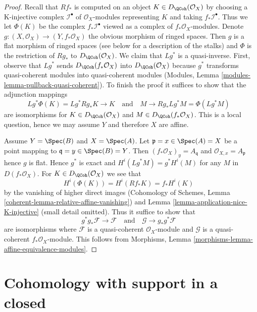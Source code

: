 \begin{proof}
Recall that $Rf_*$ is computed on an object $K \in D_\QCoh(\mathcal{O}_X)$
by choosing a K-injective complex $\mathcal{I}^\bullet$ of
$\mathcal{O}_X$-modules representing $K$ and taking $f_*\mathcal{I}^\bullet$.
Thus we let $\Phi(K)$ be the complex $f_*\mathcal{I}^\bullet$
viewed as a complex of $f_*\mathcal{O}_X$-modules.
Denote $g : (X, \mathcal{O}_X) \to (Y, f_*\mathcal{O}_X)$ the
obvious morphism of ringed spaces. Then $g$ is a flat morphism of
ringed spaces (see below for a description of the stalks) and
$\Phi$ is the restriction of $Rg_*$ to $D_\QCoh(\mathcal{O}_X)$.
We claim that $Lg^*$ is a quasi-inverse. First, observe that
$Lg^*$ sends $D_\QCoh(f_*\mathcal{O}_X)$ into $D_\QCoh(\mathcal{O}_X)$
because $g^*$ transforms quasi-coherent modules into quasi-coherent
modules (Modules, Lemma \ref{modules-lemma-pullback-quasi-coherent}).
To finish the proof it suffices to show that
the adjunction mappings
$$
Lg^*\Phi(K) = Lg^*Rg_*K \to K
\quad\text{and}\quad
M \to Rg_*Lg^*M = \Phi(Lg^*M)
$$
are isomorphisms for $K \in D_\QCoh(\mathcal{O}_X)$ and
$M \in D_\QCoh(f_*\mathcal{O}_X)$. This is a local question, hence
we may assume $Y$ and therefore $X$ are affine.

\medskip\noindent
Assume $Y = \Spec(B)$ and $X = \Spec(A)$. Let
$\mathfrak p = x \in \Spec(A) = X$ be a point mapping to
$\mathfrak q = y \in \Spec(B) = Y$. Then
$(f_*\mathcal{O}_X)_y = A_\mathfrak q$ and $\mathcal{O}_{X, x} = A_\mathfrak p$
hence $g$ is flat. Hence $g^*$ is exact and $H^i(Lg^*M) = g^*H^i(M)$
for any $M$ in $D(f_*\mathcal{O}_X)$.
For $K \in D_\QCoh(\mathcal{O}_X)$ we see that
$$
H^i(\Phi(K)) = H^i(Rf_*K) = f_*H^i(K)
$$
by the vanishing of higher direct images
(Cohomology of Schemes, Lemma \ref{coherent-lemma-relative-affine-vanishing})
and Lemma \ref{lemma-application-nice-K-injective} (small detail omitted).
Thus it suffice to show that
$$
g^*g_*\mathcal{F} \to \mathcal{F}
\quad\text{and}\quad
\mathcal{G} \to g_*g^*\mathcal{F}
$$
are isomorphisms where $\mathcal{F}$ is
a quasi-coherent $\mathcal{O}_X$-module and $\mathcal{G}$ is
a quasi-coherent $f_*\mathcal{O}_X$-module. This follows from
Morphisms, Lemma \ref{morphisms-lemma-affine-equivalence-modules}.
\end{proof}





\section{Cohomology with support in a closed}
\label{section-cohomology-support}

